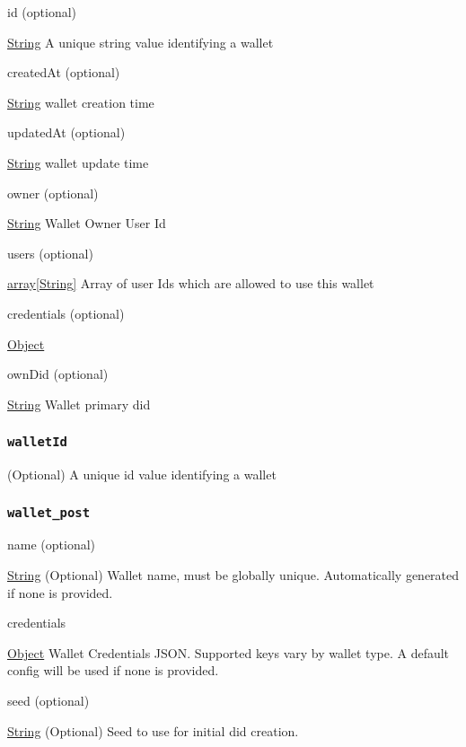 id (optional)

{\protect\hyperlink{string}{String}} A unique string value identifying a
wallet

createdAt (optional)

{\protect\hyperlink{string}{String}} wallet creation time

updatedAt (optional)

{\protect\hyperlink{string}{String}} wallet update time

owner (optional)

{\protect\hyperlink{string}{String}} Wallet Owner User Id

users (optional)

{\protect\hyperlink{string}{array{[}String{]}}} Array of user Ids which
are allowed to use this wallet

credentials (optional)

{\protect\hyperlink{object}{Object}}

ownDid (optional)

{\protect\hyperlink{string}{String}} Wallet primary did

\hypertarget{walletid}{%
\subsubsection{\texorpdfstring{\protect\hypertarget{walletId}{}{\texttt{walletId}}}{walletId}}\label{walletid}}

(Optional) A unique id value identifying a wallet

\hypertarget{wallet_post}{%
\subsubsection{\texorpdfstring{\protect\hypertarget{wallet_post}{}{\texttt{wallet\_post}}}{wallet\_post}}\label{wallet_post}}

name (optional)

{\protect\hyperlink{string}{String}} (Optional) Wallet name, must be
globally unique. Automatically generated if none is provided.

credentials

{\protect\hyperlink{object}{Object}} Wallet Credentials JSON. Supported
keys vary by wallet type. A default config will be used if none is
provided.

seed (optional)

{\protect\hyperlink{string}{String}} (Optional) Seed to use for initial
did creation.
